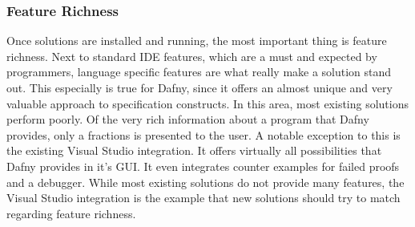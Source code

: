 \subsubsection{Feature Richness}
Once solutions are installed and running, the most important thing is feature richness. Next to standard IDE features, which are a must and expected by programmers, language specific features are what really make a solution stand out. This especially is true for Dafny, since it offers an almost unique and very valuable approach to specification constructs. In this area, most existing solutions perform poorly. Of the very rich information about a program that Dafny provides, only a fractions is presented to the user. \newline
A notable exception to this is the existing Visual Studio integration. It offers virtually all possibilities that Dafny provides in it's GUI. It even integrates counter examples for failed proofs and a debugger. While most existing solutions do not provide many features, the Visual Studio integration is the example that new solutions should try to match regarding feature richness.

